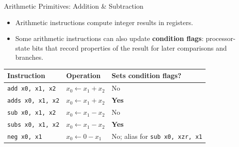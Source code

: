 \documentclass[aspectratio=169,11pt,t]{beamer}
\newcommand{\key}[1]{\textbf{#1}}
\newcommand{\code}[1]{\texttt{#1}}
\begin{document}
\begin{frame}{Arithmetic Primitives: Addition \& Subtraction}
\large
\begin{itemize}\setlength{\itemsep}{6pt}
  \item Arithmetic instructions compute integer results in registers.
  \item Some arithmetic instructions can also update \key{condition flags}: processor-state bits that record properties of the result for later comparisons and branches.
\end{itemize}

\vspace{0.15cm}
\begin{center}
\small
\setlength{\tabcolsep}{6pt}
\begin{tabular}{lll}
\toprule
\textbf{Instruction} & \textbf{Operation} & \textbf{Sets condition flags?} \\
\midrule
\code{add  x0, x1, x2}  & $x_0 \leftarrow x_1 + x_2$ & No \\
\code{adds x0, x1, x2}  & $x_0 \leftarrow x_1 + x_2$ & \key{Yes} \\
\code{sub  x0, x1, x2}  & $x_0 \leftarrow x_1 - x_2$ & No \\
\code{subs x0, x1, x2}  & $x_0 \leftarrow x_1 - x_2$ & \key{Yes} \\
\code{neg  x0, x1}      & $x_0 \leftarrow 0 - x_1$   & No; alias for \code{sub x0, xzr, x1} \\
\bottomrule
\end{tabular}
\end{center}
\end{frame}





\end{document}
